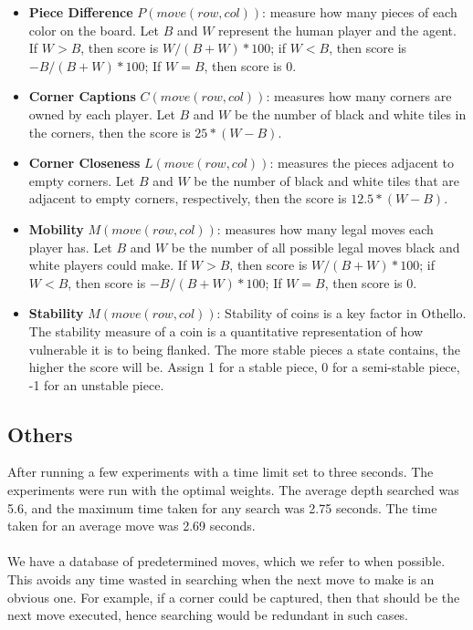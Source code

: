 \documentclass[letterpaper,12pt]{article}
\begin{document}
\begin{itemize}
\item \textbf{Piece Difference} $P(move(row, col))$: measure how many pieces of each color on the board. Let $B$ and $W$ represent the human player and the agent. If $W > B$, then score is $W/(B+W) * 100$; if $W < B$, then score is $-B/(B+W) * 100$; If $W = B$, then score is 0.
\item \textbf{Corner Captions} $C(move(row, col))$: measures how many corners are owned by each player. Let $B$ and $W$ be the number of black and white tiles in the corners, then the score is $25*(W - B)$.
\item \textbf{Corner Closeness} $L(move(row, col))$: measures the pieces adjacent to empty corners. Let $B$ and $W$ be the number of black and white tiles that are adjacent to empty corners, respectively, then the score is $12.5*(W - B)$.
\item \textbf{Mobility} $M(move(row, col))$: measures how many legal moves each player has. Let $B$ and $W$ be the number of all possible legal moves black and white players could make. If $W > B$, then score is $W/(B+W) * 100$; if $W < B$, then score is $-B/(B+W) * 100$; If $W = B$, then score is 0.
\item \textbf{Stability} $M(move(row, col))$: Stability of coins is a key factor in Othello. The stability measure of a coin is a quantitative representation of how vulnerable it is to being flanked. The more stable pieces a state contains, the higher the score will be. Assign 1 for a stable piece, 0 for a semi-stable piece, -1 for an unstable piece.
\end{itemize}

\subsection{Others}

After running a few experiments with a time limit set to three seconds. The experiments were run with the optimal weights. The average depth searched was 5.6, and the maximum time taken for any search
was 2.75 seconds. The time taken for an average move was 2.69 seconds.\\\\
\noindent
We have a database of predetermined moves, which we refer to when possible. This avoids any time wasted in  searching when the next move to make is an obvious one. For example, if a corner could be captured, then that should be the next move executed, hence searching would be redundant in such cases.
\end{document}
